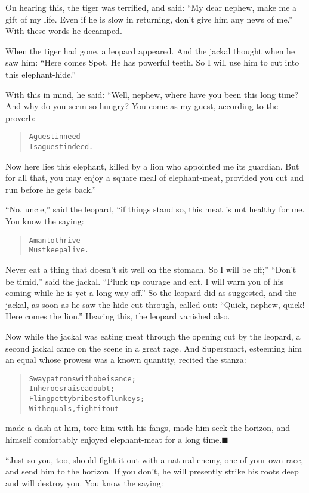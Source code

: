 \documentclass[article, twoside, 14pt]{memoir}
\newcommand{\qed}{\hfill \ensuremath{\blacksquare}}
\renewenvironment{verbatim}{%
\begin{quote}%
\vskip -10pt%
\begin{alltt}\normalfont\large}{\end{alltt}%
\end{quote}%
\vskip -10pt
} %
\begin{document}
On hearing this, the tiger was terrified, and said:
``My dear nephew, make me a gift of my life. Even if he is slow in returning, don't give him any news of me.''
With these words he decamped.

When the tiger had gone, a leopard appeared. And the jackal thought
when he saw him:
``Here comes Spot. He has powerful teeth. So I will use him to cut into this elephant-hide.''

With this in mind, he said: “Well, nephew, where have you been this
long time? And why do you seem so hungry? You come as my guest,
according to the proverb:

\begin{verbatim}
A guest in need
Is a guest indeed.
\end{verbatim}
Now here lies this elephant, killed by a lion who appointed me its
guardian. But for all that, you may enjoy a square meal of
elephant-meat, provided you cut and run before he gets back.”

``No, uncle,'' said the leopard, “if things stand so, this meat is
not healthy for me. You know the saying:

\begin{verbatim}
A man to thrive
Must keep alive.
\end{verbatim}
Never eat a thing that doesn't sit well on the stomach. So I will
be off;” ``Don't be timid,'' said the jackal.
``Pluck up courage and eat. I will warn you of his coming while he is yet a long way off.''
So the leopard did as suggested, and the jackal, as soon as he saw
the hide cut through, called out:
``Quick, nephew, quick! Here comes the lion.'' Hearing this, the
leopard vanished also.

Now while the jackal was eating meat through the opening cut by the
leopard, a second jackal came on the scene in a great rage. And
Supersmart, esteeming him an equal whose prowess was a known
quantity, recited the stanza:

\begin{verbatim}
Sway patrons with obeisance;
    In heroes raise a doubt;
Fling petty bribes to flunkeys;
    With equals, fight it out{\textemdash}
\end{verbatim}
made a dash at him, tore him with his fangs, made him seek
the horizon, and himself comfortably enjoyed elephant-meat for a
long time.\hyperref[s76]{\qed}

“Just so you, too, should fight it out with a natural enemy, one of
your own race, and send him to the horizon. If you don't, he will
presently strike his roots deep and will destroy you. You know the
saying:
\end{document}

